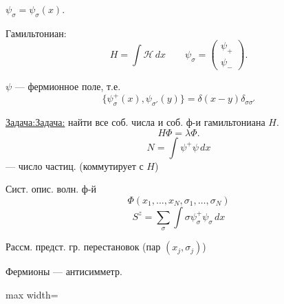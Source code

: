 \documentclass[11pt]{article}
\theoremstyle{definition}
\theoremstyle{remark}
\let\DiplomaticMathUnderline\underline
\renewcommand{\underline}[1]{\ifmmode\DiplomaticMathUnderline{#1}\else\uline{#1}\fi}
\begin{document}
$\psi_\sigma=\psi_\sigma(x)$.

Гамильтониан:
\begin{equation}
H=\int\mathcal{H}\,dx
\qquad
\psi_\sigma=\begin{pmatrix}\psi_+\\\psi_-\end{pmatrix}.
\tag{21}
\end{equation}

$\psi$ — фермионное поле, т.е.
\begin{equation}
\{\psi_\sigma^+(x),\psi_{\sigma'}(y)\}
=\delta(x-y)\delta_{\sigma\sigma'}
\tag{22}
\end{equation}

\underline{Задача:} найти все соб. числа и соб. ф-и гамильтониана $H$.
\begin{equation}
H\Phi=\lambda\Phi.
\tag{23}
\end{equation}
\begin{equation}
N=\int\psi^+\psi\,dx
\tag{24}
\end{equation}
— число частиц. (коммутирует с $H$)

Сист. опис. волн. ф-й
\begin{equation*}
\Phi(x_1,\ldots,x_N,\sigma_1,\ldots,\sigma_N)
\end{equation*}
\begin{equation}
S^z=\sum_\sigma\int\sigma\psi_\sigma^+\psi_\sigma\,dx
\tag{25}
\end{equation}

Рассм. предст. гр. перестановок (пар $(x_j,\sigma_j)$)

Фермионы — антисимметр.

\begin{center}
\begin{adjustbox}{max width=\linewidth}
\end{adjustbox}
\end{center}
\end{document}
